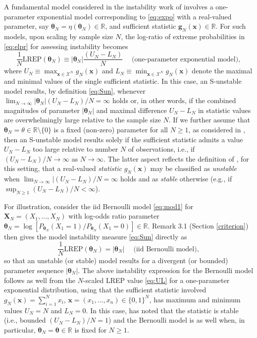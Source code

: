 \documentclass[numbib]{imamat}
\theoremstyle{theorem}
\theoremstyle{lemma}
\theoremstyle{example}
\theoremstyle{corollary}
\theoremstyle{definition}
\theoremstyle{remark}
\theoremstyle{approximation}
\theoremstyle{scheme}
\newcommand{\REP}{\mathrm{LREP}}
\newcommand{\ak}[1]{{\color{blue} #1}}
\begin{document}
A fundamental model considered in the instability work of \citet{schweinberger2011instability} involves a one-parameter exponential model corresponding to \eqref{eq:expo} with a real-valued parameter, say \(\boldsymbol \theta_N = \eta(\boldsymbol \theta_N)\in \mathbb{R}\), and sufficient statistic \(\boldsymbol g_N(\boldsymbol x)\in \mathbb{R}\).
For such models, upon scaling by sample size \(N\), the log-ratio of extreme probabilities in \eqref{eq:elpr} for assessing instability becomes
\begin{equation}
\label{eq:UL}
\frac{1}{N}\REP(\boldsymbol \theta_N ) \equiv   |\boldsymbol \theta_N| \frac{(U_N-L_N)}{N} \;\quad \text{(one-parameter exponential model)},
\end{equation}
where \(U_N \equiv \max_{\boldsymbol x\in\mathcal{X}^N}g_N(\boldsymbol x)\) and \(L_N \equiv \min_{\boldsymbol x\in\mathcal{X}^N}g_N(\boldsymbol x)\) denote the maximal and minimal values of the single sufficient statistic. In this case, an S-unstable model results, by definition \eqref{eq:Sun}, whenever \(\lim_{N\to \infty} |\boldsymbol \theta_N| (U_N-L_N)/N= \infty\) holds or, in other words, if the combined magnitudes of parameter \(|\boldsymbol \theta_N|\) and maximal difference \(U_N-L_N\) in statistic values are overwhelmingly large relative to the sample size \(N\). If we further assume that \(\boldsymbol \theta_N =\theta\in\mathbb{R}\setminus \{0\}\) is a fixed (non-zero) parameter for all \(N \geq 1\), as considered in \citet{schweinberger2011instability}, then an S-unstable model results solely if the sufficient statistic admits a value \(U_N-L_N\) too large relative to number \(N\) of observations, i.e., if \((U_N-L_N)/N\to \infty\) as \(N\to \infty\). The latter aspect reflects the definition of \citet{schweinberger2011instability}, for this setting, that a real-valued \emph{statistic} \(g_N(\boldsymbol x)\) may be classified as \emph{unstable} when \(\lim_{N\to \infty}|(U_N-L_N)/N=\infty\) holds and as \emph{stable} otherwise (e.g., if \(\sup_{N \geq 1}(U_N-L_N)/N<\infty\)).

For illustration, consider the iid Bernoulli model \eqref{eq:mod1} for \(\boldsymbol X_N=(X_1,\ldots,X_N)\) with log-odds ratio parameter \(\boldsymbol \theta_N = \log[ P_{\boldsymbol \theta_N}(X_1=1)/ P_{\boldsymbol \theta_N}(X_1=0)]\in\mathbb{R}\). \ak{Remark 3.1} (Section \ref{criterion}) then gives the model instability measure \eqref{eq:Sun} directly as
\[
\frac{1}{N}\REP(\boldsymbol \theta_N ) = |\boldsymbol \theta_N|\quad\; \text{(iid Bernoulli model)},
\]
so that an unstable (or stable) model results for a divergent (or bounded) parameter sequence \(|\boldsymbol \theta_N|\). The above instability expression for the Bernoulli model follows as well from the \(N\)-scaled LREP value \eqref{eq:UL} for a one-parameter exponential distribution, using that the sufficient statistic involved \(g_N(\boldsymbol x)= \sum_{i=1}^N x_i\), \(\boldsymbol x =(x_1,\ldots,x_n)\in\{0,1\}^N\), has maximum and minimum values \(U_N=N\) and \(L_N=0\). In this case, \citet{schweinberger2011instability} has noted that the statistic is stable (i.e., bounded \((U_N-L_N)/N=1\)) and the Bernoulli model is as well when, in particular, \(\boldsymbol \theta_N=\boldsymbol \theta \in\mathbb{R}\) is fixed for \(N \geq 1\).
\end{document}
